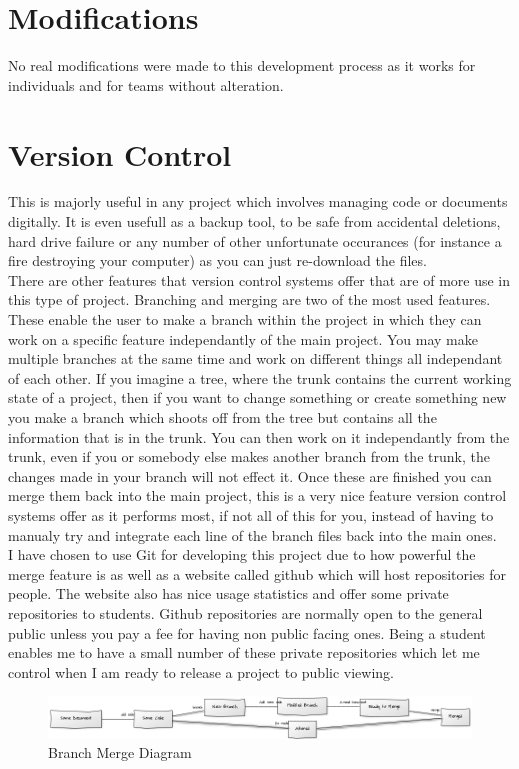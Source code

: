 \section{Modifications}
No real modifications were made to this development process as it works for individuals and for teams without alteration.

\section{Version Control}
This is majorly useful in any project which involves managing code or documents digitally.  It is even usefull as a backup tool, to be safe from accidental deletions, hard drive failure or any number of other unfortunate occurances (for instance a fire destroying your computer) as you can just re-download the files.
\\There are other features that version control systems offer that are of more use in this type of project.  Branching and merging are two of the most used features.  These enable the user to make a branch within the project in which they can work on a specific feature independantly of the main project.  You may make multiple branches at the same time and work on different things all independant of each other.  If you imagine a tree, where the trunk contains the current working state of a project, then if you want to change something or create something new you make a branch which shoots off from the tree but contains all the information that is in the trunk.  You can then work on it independantly from the trunk, even if you or somebody else makes another branch from the trunk, the changes made in your branch will not effect it.  Once these are finished you can merge them back into the main project, this is a very nice feature version control systems offer as it performs most, if not all of this for you, instead of having to manualy try and integrate each line of the branch files back into the main ones.
\\I have chosen to use Git for developing this project due to how powerful the merge feature is as well as a website called github \cite{github} which will host repositories for people.  The website also has nice usage statistics and offer some private repositories to students.  Github repositories are normally open to the general public unless you pay a fee for having non public facing ones.  Being a student enables me to have a small number of these private repositories which let me control when I am ready to release a project to public viewing.
\begin{figure}[h]
\centering
        \includegraphics[width=6.0in] {Images/git-branch-merge.png}
        \caption{Branch Merge Diagram}
        \label{Branch Merge Diagram}
\end{figure}

